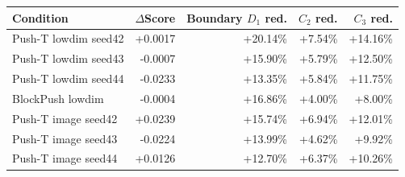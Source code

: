 \begin{tabular}{lrrrr}
\toprule
Condition & $\Delta$Score & Boundary $D_1$ red. & $C_2$ red. & $C_3$ red. \\
\midrule
Push-T lowdim seed42 & +0.0017 & +20.14\% & +7.54\% & +14.16\% \\
Push-T lowdim seed43 & -0.0007 & +15.90\% & +5.79\% & +12.50\% \\
Push-T lowdim seed44 & -0.0233 & +13.35\% & +5.84\% & +11.75\% \\
BlockPush lowdim & -0.0004 & +16.86\% & +4.00\% & +8.00\% \\
Push-T image seed42 & +0.0239 & +15.74\% & +6.94\% & +12.01\% \\
Push-T image seed43 & -0.0224 & +13.99\% & +4.62\% & +9.92\% \\
Push-T image seed44 & +0.0126 & +12.70\% & +6.37\% & +10.26\% \\
\bottomrule
\end{tabular}
